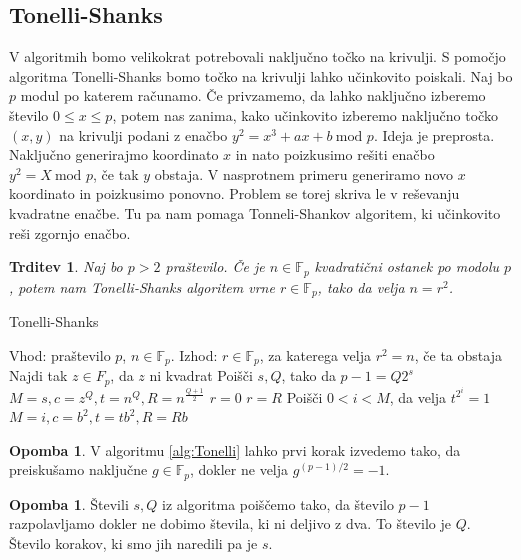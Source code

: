 \documentclass[12pt,a4paper,twoside]{article}
\theoremstyle{definition} %
\newtheorem{opomba}[definicija]{Opomba}
\theoremstyle{plain} %
\newtheorem{trditev}[definicija]{Trditev}
\numberwithin{equation}{section}  %
\newcommand{\F}{\mathbb F}
\begin{document}
\subsection{Tonelli-Shanks}
V algoritmih bomo velikokrat potrebovali naključno točko na krivulji. S pomočjo algoritma Tonelli-Shanks \cite{Tonelli1891} bomo točko na krivulji lahko učinkovito poiskali. Naj bo $p$ modul po katerem računamo.
Če privzamemo, da lahko naključno izberemo število $0 \leq x \leq p$, potem nas zanima, kako učinkovito izberemo naključno točko $(x,y)$ na krivulji podani z enačbo
$y^2 = x^3 +ax+b \ \text{mod } p$. Ideja je preprosta. Naključno generirajmo koordinato $x$ in nato poizkusimo rešiti enačbo $y^2 = X \ \text{mod } p$, če tak $y$ obstaja. V nasprotnem primeru generiramo novo $x$ koordinato in poizkusimo ponovno. Problem se torej skriva le v reševanju kvadratne enačbe. Tu pa nam pomaga Tonneli-Shankov algoritem, ki učinkovito reši zgornjo enačbo.

\begin{trditev}
Naj bo $p > 2$ praštevilo. Če je $n \in \F_p$ kvadratični ostanek po modolu $p$, potem nam Tonelli-Shanks algoritem vrne $r \in \F_p$, tako da velja $n = r^2$.

\end{trditev}

\begin{algorithm}[H]
\caption[Tonelli]{Tonelli-Shanks}
\label{alg:Tonelli}

\begin{algorithmic}
\State Vhod: praštevilo $p$, $n \in \F_p$.
\State Izhod: $r \in \F_p$, za katerega velja $r^2=n$, če ta obstaja
\State Najdi tak $z \in F_p$, da $z$ ni kvadrat
\State Poišči $s,Q$, tako da $p-1 = Q2^s$
\State $M = s,c = z^Q,t = n^Q,R=n^{\frac{Q+1}{2}}$
		\State \Return $r=0$
		\State \Return $r=R$
	\Else
		\State Poišči $0<i<M$, da velja $t^{2^i} = 1$
		\State  $M = i,c = b^2,t = tb^2,R=Rb$
	\EndIf
\EndWhile
\end{algorithmic}
\end{algorithm}

\begin{opomba}
V algoritmu \ref{alg:Tonelli} lahko prvi korak izvedemo tako, da preiskušamo naključne $g\in \F_p$, dokler ne velja $g^{(p-1)/2} = -1$.
\end{opomba}

\begin{opomba}
Števili $s, Q$ iz algoritma poiščemo tako, da število $p-1$ razpolavljamo dokler ne dobimo števila, ki ni deljivo z dva. To število je $Q$. Število korakov, ki smo jih naredili pa je $s$.
\end{opomba}
\end{document}
